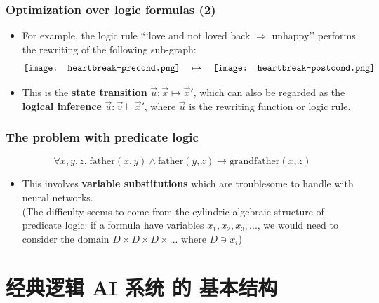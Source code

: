 \documentclass[17pt]{beamer}
\begin{document}
\begin{frame}
\frametitle{Optimization over logic formulas (2)}
\begin{itemize}
	\item For example, the logic rule ```love and not loved back $\Rightarrow$ unhappy'' performs the rewriting of the following sub-graph:
	\begin{equation}
	\vcenter{\hbox{\texttt{[image: heartbreak-precond.png]}}}
	\quad \mapsto \quad
	\vcenter{\hbox{\texttt{[image: heartbreak-postcond.png]}}}
	\end{equation}
	\item This is the \textbf{state transition} $\vec{u}: \vec{x} \mapsto \vec{x}'$, which can also be regarded as the \textbf{logical inference} $\vec{u}: \vec{v} \vdash \vec{x}'$, where $\vec{u}$ is the rewriting function or logic rule.
\end{itemize}
\end{frame}

\begin{frame}
\frametitle{The problem with predicate logic}
\begin{equation}
\forall x,y,z. \; \mbox{father}(x,y) \wedge \mbox{father}(y,z) \rightarrow \mbox{grandfather}(x,z)
\end{equation}
\begin{itemize}
	\item This involves \textbf{variable substitutions} which are troublesome to handle with neural networks. \\
	(The difficulty seems to come from the cylindric-algebraic structure of predicate logic:  if a formula have variables $x_1, x_2, x_3, ...$, we would need to consider the domain $D \times D \times D \times ...$ where $D \ni x_i$)
\end{itemize}
\end{frame}

\section{经典逻辑 AI 系统 的 基本结构}


\end{document}
